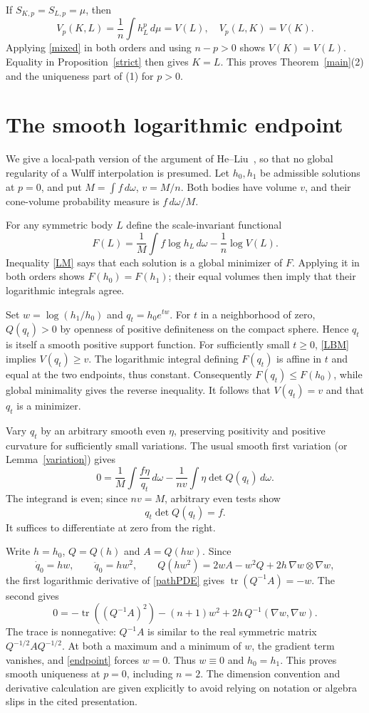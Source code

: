 \documentclass[11pt]{article}
\newcommand{\tr}{\operatorname{tr}}
\newcommand{\Q}{Q}
\begin{document}
If $S_{K,p}=S_{L,p}=\mu$, then
\[
 V_p(K,L)=\frac1n\int h_L^p\,d\mu=V(L),\quad V_p(L,K)=V(K).
\]
Applying \eqref{mixed} in both orders and using $n-p>0$ shows $V(K)=V(L)$. Equality in Proposition~\ref{strict} then gives $K=L$. This proves Theorem~\ref{main}(2) and the uniqueness part of (1) for $p>0$.

\section{The smooth logarithmic endpoint}

We give a local-path version of the argument of He--Liu~\cite[Section 3]{HL}, so that no global regularity of a Wulff interpolation is presumed. Let $h_0,h_1$ be admissible solutions at $p=0$, and put $M=\int f\,d\omega$, $v=M/n$. Both bodies have volume $v$, and their cone-volume probability measure is $f\,d\omega/M$.

For any symmetric body $L$ define the scale-invariant functional
\[
 F(L)=\frac1M\int f\log h_L\,d\omega-\frac1n\log V(L).
\]
Inequality \eqref{LM} says that each solution is a global minimizer of $F$. Applying it in both orders shows $F(h_0)=F(h_1)$; their equal volumes then imply that their logarithmic integrals agree.

Set $w=\log(h_1/h_0)$ and $q_t=h_0e^{tw}$. For $t$ in a neighborhood of zero, $\Q(q_t)>0$ by openness of positive definiteness on the compact sphere. Hence $q_t$ is itself a smooth positive support function. For sufficiently small $t\ge0$, \eqref{LBM} implies $V(q_t)\ge v$. The logarithmic integral defining $F(q_t)$ is affine in $t$ and equal at the two endpoints, thus constant. Consequently $F(q_t)\le F(h_0)$, while global minimality gives the reverse inequality. It follows that $V(q_t)=v$ and that $q_t$ is a minimizer.

Vary $q_t$ by an arbitrary smooth even $\eta$, preserving positivity and positive curvature for sufficiently small variations. The usual smooth first variation (or Lemma~\ref{variation}) gives
\[
 0=\frac1M\int\frac{f\eta}{q_t}\,d\omega
     -\frac{1}{nv}\int\eta\det\Q(q_t)\,d\omega.
\]
The integrand is even; since $nv=M$, arbitrary even tests show
\begin{equation}\label{pathPDE}
 q_t\det\Q(q_t)=f.
\end{equation}
It suffices to differentiate at zero from the right.

Write $h=h_0$, $Q=\Q(h)$ and $A=\Q(hw)$. Since
\[
 \dot q_0=hw,\qquad \ddot q_0=hw^2,\qquad
 \Q(hw^2)=2wA-w^2Q+2h\,\nabla w\otimes\nabla w,
\]
the first logarithmic derivative of \eqref{pathPDE} gives
$\tr(Q^{-1}A)=-w$. The second gives
\begin{equation}\label{endpoint}
 0=-\tr((Q^{-1}A)^2)-(n+1)w^2
       +2h\,Q^{-1}(\nabla w,\nabla w).
\end{equation}
The trace is nonnegative: $Q^{-1}A$ is similar to the real symmetric matrix $Q^{-1/2}AQ^{-1/2}$. At both a maximum and a minimum of $w$, the gradient term vanishes, and \eqref{endpoint} forces $w=0$. Thus $w\equiv0$ and $h_0=h_1$. This proves smooth uniqueness at $p=0$, including $n=2$. The dimension convention and derivative calculation are given explicitly to avoid relying on notation or algebra slips in the cited presentation.
\end{document}
